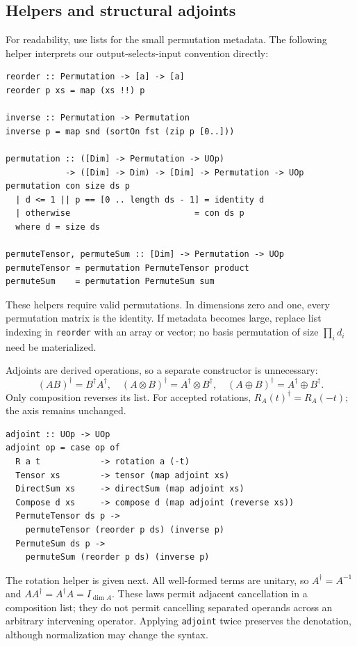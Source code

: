 \documentclass[11pt,a4paper]{article}
\newcommand{\code}[1]{\texttt{#1}}
\newcommand{\Rot}[2]{R_{#1}(#2)}
\begin{document}
\subsection{Helpers and structural adjoints}

\label{sec:adjoints}

For readability, use lists for the small permutation metadata. The
following helper interprets our output-selects-input convention directly:

\begin{lstlisting}
reorder :: Permutation -> [a] -> [a]
reorder p xs = map (xs !!) p

inverse :: Permutation -> Permutation
inverse p = map snd (sortOn fst (zip p [0..]))

permutation :: ([Dim] -> Permutation -> UOp)
            -> ([Dim] -> Dim) -> [Dim] -> Permutation -> UOp
permutation con size ds p
  | d <= 1 || p == [0 .. length ds - 1] = identity d
  | otherwise                         = con ds p
  where d = size ds

permuteTensor, permuteSum :: [Dim] -> Permutation -> UOp
permuteTensor = permutation PermuteTensor product
permuteSum    = permutation PermuteSum sum
\end{lstlisting}

These helpers require valid permutations. In dimensions zero and one,
every permutation matrix is the identity. If metadata becomes large,
replace list indexing in \code{reorder} with an array or vector; no
basis permutation of size $\prod_i d_i$ need be materialized.

Adjoints are derived operations, so a separate constructor is unnecessary:
\[
 (AB)^\dagger=B^\dagger A^\dagger,\quad
 (A\otimes B)^\dagger=A^\dagger\otimes B^\dagger,\quad
 (A\oplus B)^\dagger=A^\dagger\oplus B^\dagger.
\]
Only composition reverses its list. For accepted rotations,
$\Rot A t^\dagger=\Rot A{-t}$; the axis remains unchanged.

\begin{lstlisting}
adjoint :: UOp -> UOp
adjoint op = case op of
  R a t            -> rotation a (-t)
  Tensor xs        -> tensor (map adjoint xs)
  DirectSum xs     -> directSum (map adjoint xs)
  Compose d xs     -> compose d (map adjoint (reverse xs))
  PermuteTensor ds p ->
    permuteTensor (reorder p ds) (inverse p)
  PermuteSum ds p ->
    permuteSum (reorder p ds) (inverse p)
\end{lstlisting}

The rotation helper is given next. All well-formed terms are unitary, so
$A^\dagger=A^{-1}$ and $AA^\dagger=A^\dagger A=I_{\dim A}$.
These laws permit adjacent cancellation in a composition list; they do
not permit cancelling separated operands across an arbitrary intervening
operator. Applying \code{adjoint} twice preserves the denotation, although
normalization may change the syntax.
\end{document}
